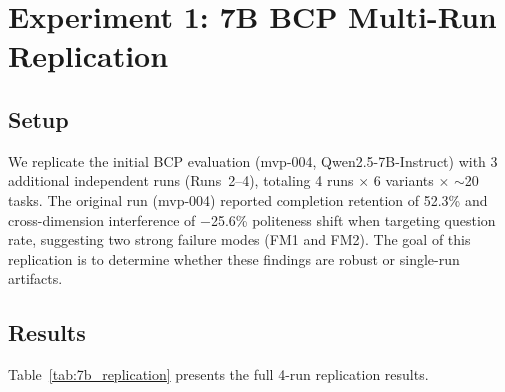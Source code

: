 \documentclass[11pt]{article}
\begin{document}
\section{Experiment 1: 7B BCP Multi-Run Replication}
\label{sec:exp1}

\subsection{Setup}

We replicate the initial BCP evaluation (mvp-004, Qwen2.5-7B-Instruct) with 3 additional independent runs (Runs~2--4), totaling 4 runs $\times$ 6 variants $\times$ ${\sim}$20 tasks.
The original run (mvp-004) reported completion retention of 52.3\% and cross-dimension interference of $-$25.6\% politeness shift when targeting question rate, suggesting two strong failure modes (FM1 and FM2).
The goal of this replication is to determine whether these findings are robust or single-run artifacts.

\subsection{Results}

Table~\ref{tab:7b_replication} presents the full 4-run replication results.
\end{document}
